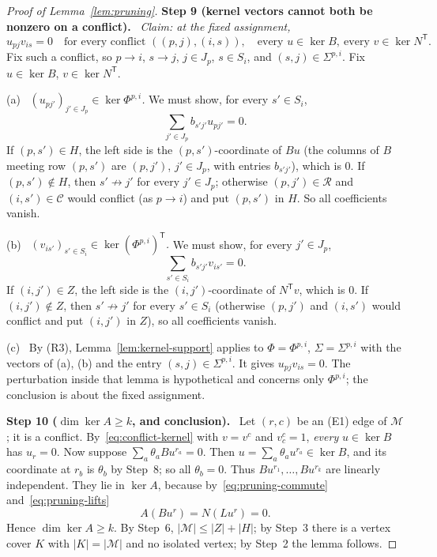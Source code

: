 \documentclass[11pt]{article}
\theoremstyle{remark}
\newcommand{\abs}[1]{\lvert #1\rvert}
\newcommand{\step}[1]{\par\medskip\noindent\textbf{Step #1.}\ }
\newcommand{\substep}[1]{\par\smallskip\noindent\textup{(#1)}\ }
\begin{document}
\begin{proof}[Proof of Lemma~\ref{lem:pruning}]
\step{9 (kernel vectors cannot both be nonzero on a conflict)}
\emph{Claim: at the fixed assignment,}
\begin{equation}\label{eq:conflict-kernel}
 u_{pj}v_{is}=0
 \quad\text{for every conflict }((p,j),(i,s)),
 \quad\text{every }u\in\ker B,\ \text{every }v\in\ker N^{\mathsf T}.
\end{equation}
Fix such a conflict, so $p\to i$, $s\to j$, $j\in J_p$, $s\in S_i$, and
$(s,j)\in\Sigma^{p,i}$. Fix $u\in\ker B$, $v\in\ker N^{\mathsf T}$.

\substep{a} \emph{$(u_{pj'})_{j'\in J_p}\in\ker\Phi^{p,i}$.}
We must show, for every $s'\in S_i$,
\begin{equation}\label{eq:pruning-row-equation}
 \sum_{j'\in J_p}b_{s'j'}u_{pj'}=0.
\end{equation}
If $(p,s')\in H$, the left side is the $(p,s')$-coordinate of $Bu$ (the
columns of $B$ meeting row $(p,s')$ are $(p,j')$, $j'\in J_p$, with entries
$b_{s'j'}$), which is $0$. If $(p,s')\notin H$, then $s'\not\to j'$ for every
$j'\in J_p$; otherwise $(p,j')\in\mathcal R$ and $(i,s')\in\mathcal C$ would
conflict (as $p\to i$) and put $(p,s')$ in $H$. So all coefficients vanish.

\substep{b} \emph{$(v_{is'})_{s'\in S_i}\in\ker(\Phi^{p,i})^{\mathsf T}$.}
We must show, for every $j'\in J_p$,
\begin{equation}\label{eq:pruning-column-equation}
 \sum_{s'\in S_i}b_{s'j'}v_{is'}=0.
\end{equation}
If $(i,j')\in Z$, the left side is the $(i,j')$-coordinate of
$N^{\mathsf T}v$, which is $0$. If $(i,j')\notin Z$, then $s'\not\to j'$ for
every $s'\in S_i$ (otherwise $(p,j')$ and $(i,s')$ would conflict and put
$(i,j')$ in $Z$), so all coefficients vanish.

\substep{c} By (R3), Lemma~\ref{lem:kernel-support} applies to
$\Phi=\Phi^{p,i}$, $\Sigma=\Sigma^{p,i}$ with the vectors of (a), (b) and
the entry $(s,j)\in\Sigma^{p,i}$. It gives $u_{pj}v_{is}=0$. The perturbation
inside that lemma is hypothetical and concerns only $\Phi^{p,i}$; the
conclusion is about the fixed assignment.

\step{10 ($\dim\ker A\ge k$, and conclusion)}
Let $(r,c)$ be an (E1) edge of $\mathcal M$; it is a conflict.
By~\eqref{eq:conflict-kernel} with $v=v^c$ and $v^c_c=1$, \emph{every}
$u\in\ker B$ has $u_r=0$. Now suppose $\sum_{a}\theta_a Bu^{r_a}=0$. Then
$u=\sum_a\theta_au^{r_a}\in\ker B$, and its coordinate at $r_b$ is $\theta_b$
by Step~8; so all $\theta_b=0$. Thus $Bu^{r_1},\dots,Bu^{r_k}$ are linearly
independent. They lie in $\ker A$, because by~\eqref{eq:pruning-commute}
and~\eqref{eq:pruning-lifts}
\[
 A(Bu^r)=N(Lu^r)=0 .
\]
Hence $\dim\ker A\geq k$. By Step~6,
$\abs{\mathcal M}\leq\abs Z+\abs H$; by Step~3 there is a vertex cover $K$
with $\abs K=\abs{\mathcal M}$ and no isolated vertex; by Step~2 the lemma
follows.
\end{proof}
\end{document}
